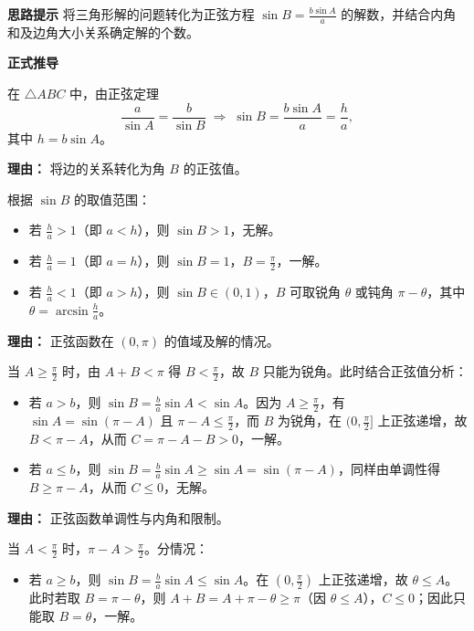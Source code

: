 \begin{proofbox}
	\textbf{\textcolor{CProof}{思路提示}}
	将三角形解的问题转化为正弦方程 $\sin B = \frac{b\sin A}{a}$ 的解数，并结合内角和及边角大小关系确定解的个数。

	\medskip
	\textbf{\textcolor{CProof}{正式推导}}
	\begin{description}[style=nextline, leftmargin=2.8em, labelsep=0.5em, itemsep=0.55em]
		\item[\textbf{步骤一（正弦定理转化）：}]
			在 $\triangle ABC$ 中，由正弦定理
			\[
				\frac{a}{\sin A} = \frac{b}{\sin B} \;\Rightarrow\; \sin B = \frac{b\sin A}{a} = \frac{h}{a},
			\]
			其中 $h = b\sin A$。
			\par\textbf{理由：} 将边的关系转化为角 $B$ 的正弦值。
		\item[\textbf{步骤二（初步分类）：}]
			根据 $\sin B$ 的取值范围：
			\begin{itemize}
			\item 若 $\frac{h}{a}>1$（即 $a<h$），则 $\sin B>1$，无解。
			\item 若 $\frac{h}{a}=1$（即 $a=h$），则 $\sin B=1$，$B=\frac{\pi}{2}$，一解。
			\item 若 $\frac{h}{a}<1$（即 $a>h$），则 $\sin B \in (0,1)$，$B$ 可取锐角 $\theta$ 或钝角 $\pi-\theta$，其中 $\theta=\arcsin\frac{h}{a}$。
		\end{itemize}
			\par\textbf{理由：} 正弦函数在 $(0,\pi)$ 的值域及解的情况。
		\item[\textbf{步骤三（$A$ 为钝直角情形）：}]
			当 $A\geq\frac{\pi}{2}$ 时，由 $A+B<\pi$ 得 $B<\frac{\pi}{2}$，故 $B$ 只能为锐角。此时结合正弦值分析：
			\begin{itemize}
			\item 若 $a>b$，则 $\sin B = \frac{b}{a}\sin A < \sin A$。因为 $A\geq\frac{\pi}{2}$，有 $\sin A = \sin(\pi-A)$ 且 $\pi-A\leq\frac{\pi}{2}$，而 $B$ 为锐角，在 $(0,\frac{\pi}{2}]$ 上正弦递增，故 $B < \pi-A$，从而 $C=\pi-A-B>0$，一解。
			\item 若 $a\leq b$，则 $\sin B = \frac{b}{a}\sin A \geq \sin A = \sin(\pi-A)$，同样由单调性得 $B \geq \pi-A$，从而 $C \leq 0$，无解。
		\end{itemize}
			\par\textbf{理由：} 正弦函数单调性与内角和限制。
		\item[\textbf{步骤四（$A$ 为锐角情形）：}]
			当 $A<\frac{\pi}{2}$ 时，$\pi-A>\frac{\pi}{2}$。分情况：
			\begin{itemize}
			\item 若 $a\geq b$，则 $\sin B = \frac{b}{a}\sin A \leq \sin A$。在 $(0,\frac{\pi}{2})$ 上正弦递增，故 $\theta \leq A$。此时若取 $B=\pi-\theta$，则 $A+B = A+\pi-\theta \geq \pi$（因 $\theta \leq A$），$C\leq0$；因此只能取 $B=\theta$，一解。

\end{itemize}
\end{description}
\end{proofbox}
